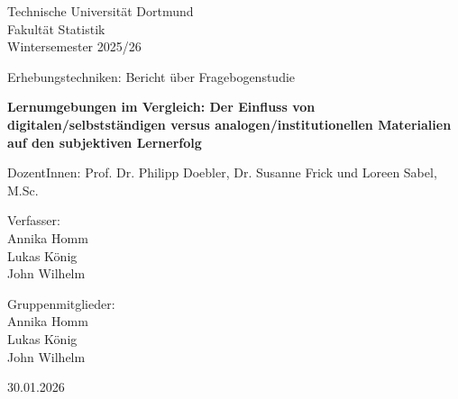 \documentclass[a4paper]{article}
\begin{document}
\thispagestyle{empty}

\begin{center}
	\Large
	Technische Universität Dortmund\\
	Fakultät Statistik\\
	Wintersemester 2025/26\\
	
	\vspace{6em}
	
	Erhebungstechniken: Bericht über Fragebogenstudie
	
	\Huge
	\textbf{Lernumgebungen im Vergleich: Der Einfluss von digitalen/selbstständigen versus analogen/institutionellen Materialien auf den subjektiven Lernerfolg}
	
	\Large
	\vspace{4em}
	DozentInnen:	Prof. Dr. Philipp Doebler, Dr. Susanne Frick und Loreen Sabel, M.Sc.


	\vspace{6em}
	Verfasser: \\
	Annika Homm\\
	Lukas König\\
	John Wilhelm
	
	\vspace{6em}
	Gruppenmitglieder:\\
	Annika Homm\\
	Lukas König\\
	John Wilhelm\\

    \vspace{6em}
    
	30.01.2026
\end{center}
\end{document}
